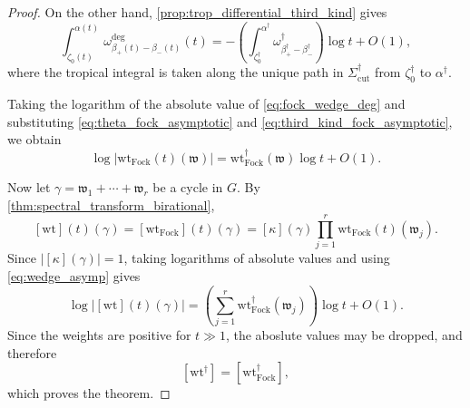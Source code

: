 \documentclass[12pt]{amsart}
\numberwithin{equation}{section}
\theoremstyle{definition}
\def\Gtor{G}
\newcommand{\wt}{\mathrm{wt}}
\def\trop{\dagger}
\def\ptSig{\zeta}
\def\basept{{\ptSig_0}}
\def\baseptT{{\ptSig_0^\trop}}
\def\mcurve{\Sigma}
\def\tropmcurve{\mcurve^\trop}
\begin{document}
\begin{proof}
On the other hand, \cref{prop:trop_differential_third_kind} gives
\begin{equation}
\label{eq:third_kind_fock_asymptotic}
\int_{\basept(t)}^{\alpha(t)}
\omega_{\beta_+(t)-\beta_-(t)}^{\mathrm{deg}}(t)
=
-
\left(
\int_{\baseptT}^{\alpha^\trop}
\omega_{\beta_+^\trop-\beta_-^\trop}^\trop
\right)
\log t
+
O(1),
\end{equation}
where the tropical integral is taken along the unique path in $\tropmcurve_{\mathrm{cut}}$ from
$\baseptT$ to $\alpha^\trop$.

Taking the logarithm of the absolute value of
\eqref{eq:fock_wedge_deg} and substituting
\eqref{eq:theta_fock_asymptotic} and
\eqref{eq:third_kind_fock_asymptotic}, we obtain
\begin{equation}
\label{eq:wedge_asymp}
\log
\left|
\wt_{\mathrm{Fock}}(t)(\mathfrak w)
\right|
=
\wt_{\mathrm{Fock}}^\trop(\mathfrak w)\log t
+
O(1).
\end{equation}

Now let
$
\gamma
=
\mathfrak w_1+\cdots+\mathfrak w_r
$
be a cycle in $\Gtor$. By \cref{thm:spectral_transform_birational},
\[
[\wt](t)(\gamma)
=
[\wt_{\mathrm{Fock}}](t)(\gamma)
=
[\kappa](\gamma)
\prod_{j=1}^r
\wt_{\mathrm{Fock}}(t)(\mathfrak w_j).
\]
Since $|[\kappa](\gamma)|=1$, taking logarithms of absolute values and
using \eqref{eq:wedge_asymp} gives
\[
\log|[\wt](t)(\gamma)|
=
\left(
\sum_{j=1}^r
\wt_{\mathrm{Fock}}^\trop(\mathfrak w_j)
\right)
\log t
+
O(1).
\]
Since the weights are positive for $t \gg 1$, the aboslute values may be dropped, and therefore
\[
[\wt^\trop]
=
[\wt_{\mathrm{Fock}}^\trop],
\]
which proves the theorem.
\end{proof}
\end{document}
